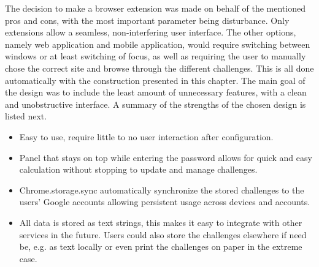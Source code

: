 \par The decision to make a browser extension was made on behalf of the mentioned pros and cons, with the most important parameter being disturbance. Only extensions allow a seamless, non-interfering user interface. The other options, namely web application and mobile application, would require switching between windows or at least switching of focus, as well as requiring the user to manually chose the correct site and browse through the different challenges. This is all done automatically with the construction presented in this chapter. The main goal of the design was to include the least amount of unnecessary features, with a clean and unobstructive interface. A summary of the strengths of the chosen design is listed next.

\begin{itemize}
    \item Easy to use, require little to no user interaction after configuration.
    \item Panel that stays on top while entering the password allows for quick and easy calculation without stopping to update and manage challenges.
    \item Chrome.storage.sync automatically synchronize the stored challenges to the users' Google accounts allowing persistent usage across devices and accounts.
    \item All data is stored as text strings, this makes it easy to integrate with other services in the future. Users could also store the challenges elsewhere if need be, e.g. as text locally or even print the challenges on paper in the extreme case.
\end{itemize}







